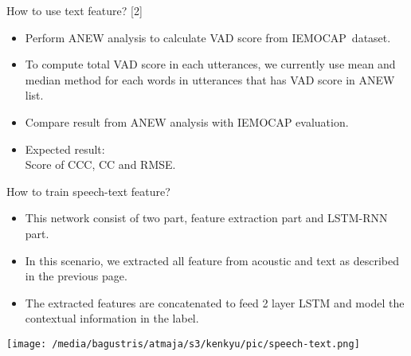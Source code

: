 \documentclass{beamer}
\begin{document}
\begin{frame}[t, fragile]{How to use text feature? [2]}
\begin{itemize}
\item Perform ANEW analysis to calculate VAD score from IEMOCAP\footnotemark ~dataset.
\item To compute total VAD score in each utterances, we currently use mean and median
      method for each words in utterances that has VAD score in ANEW list.
\item Compare result from ANEW analysis with IEMOCAP evaluation.
\item Expected result: \\
      Score of CCC, CC and RMSE.
\end{itemize}
\end{frame}


\begin{frame}[t, fragile]{How to train speech-text feature?}
\begin{itemize}
\item This network consist of two part, feature extraction part and LSTM-RNN part.
\item In this scenario, we extracted all feature from acoustic and text as described
      in the previous page.
\item The extracted features are concatenated to feed 2 layer LSTM and model the 
      contextual information in the label.
\end{itemize}
\texttt{[image: /media/bagustris/atmaja/s3/kenkyu/pic/speech-text.png]}
\end{frame}
\end{document}
